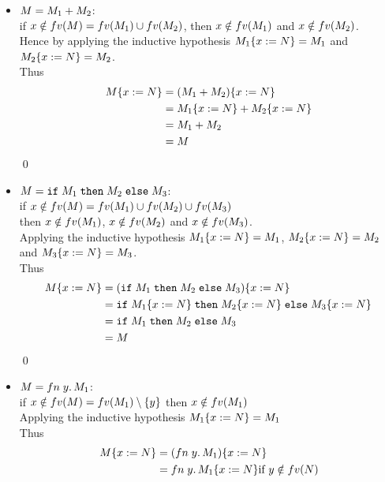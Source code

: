 \begin{itemize}
	\item $M = M_1+M_2$:\\
	      if $x \notin fv(M) = fv(M_1) \cup fv(M_2)$, then $x \notin fv(M_1)$ and $x \notin fv(M_2)$.\\
	      Hence by applying the inductive hypothesis $M_1\{x:=N\} = M_1$ and $M_2\{x:=N\} = M_2$.\\
	      Thus
	      \begin{align*}
		      M\{x:=N\} & = (M_1+M_2)\{x:=N\}           \\
		                    & = M_1\{x:=N\}+M_2\{x:=N\} \\
		                    & = M_1+M_2                         \\
		                    & = M
	      \end{align*}
	      \qed
	\item $M = \texttt{if}\;M_1\;\texttt{then}\;M_2\;\texttt{else}\;M_3$:\\
	      if $x \notin fv(M) = fv(M_1) \cup fv(M_2) \cup fv(M_3)$\\
	      then $x \notin fv(M_1)$, $x \notin fv(M_2)$ and $x \notin fv(M_3)$.\\
	      Applying the inductive hypothesis $M_1\{x:=N\} = M_1$, $M_2\{x:=N\} = M_2$\\
	      and $M_3\{x:=N\} = M_3$.\\
	      Thus
	      \begin{align*}
		      M\{x:=N\} & = (\texttt{if}\;M_1\;\texttt{then}\;M_2\;\texttt{else}\;M_3)\{x:=N\}                       \\
		                    & = \texttt{if}\;M_1\{x:=N\}\;\texttt{then}\;M_2\{x:=N\}\;\texttt{else}\;M_3\{x:=N\} \\
		                    & = \texttt{if}\;M_1\;\texttt{then}\;M_2\;\texttt{else}\;M_3                                     \\
		                    & = M
	      \end{align*}
	      \qed
	\item $M = fn\;y.\,M_1$:\\
	      if $x \notin fv(M) = fv(M_1)\setminus \{ y \}$ then $x \notin fv(M_1)$\\
	      Applying the inductive hypothesis $M_1\{x:=N\} = M_1$\\
	      Thus
	      \begin{align*}
		      M\SUBST{x}{N} & = (\FN{y}{M_1})\SUBST{x}{N}                         \\
		                    & = \FN{y}{M_1\SUBST{x}{N}} \text{if }y \notin \fv{N} \\

\end{align*}
\end{itemize}
